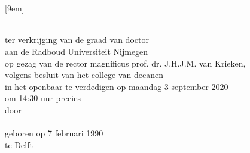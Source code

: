 \newpage

\thispagestyle{empty}
\vspace*{4em}
\begin{center}
\huge{}\\
\huge{}\\
\huge{}[9em]
\normalsize





{\Large\scshape{}}\\[2.5em]


ter verkrijging van de graad van doctor\\
aan de Radboud Universiteit Nijmegen\\
op gezag van de rector magnificus prof. dr. J.H.J.M. van Krieken,\\
volgens besluit van het college van decanen\\
in het openbaar te verdedigen op maandag 3 september 2020\\
om 14:30 uur precies\\[1.5em]

door\\[1.5em]

{\Large\scshape{}}\\[1.5em]

geboren op 7 februari 1990\\
te Delft
\end{center}
\newpage
\thispagestyle{empty}

\noindent

